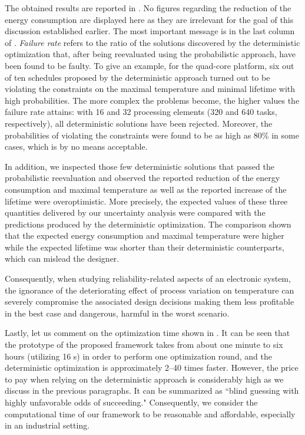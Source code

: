 The obtained results are reported in .
No figures regarding the reduction of the energy consumption are displayed here as they are irrelevant for the goal of this discussion established earlier.
The most important message is in the last column of .
\emph{Failure rate} refers to the ratio of the solutions discovered by the deterministic optimization that, after being reevaluated using the probabilistic approach, have been found to be faulty.
To give an example, for the quad-core platform, six out of ten schedules proposed by the deterministic approach turned out to be violating the constraints on the maximal temperature and minimal lifetime with high probabilities.
The more complex the problems become, the higher values the failure rate attains: with 16 and 32 processing elements (320 and 640 tasks, respectively), all deterministic solutions have been rejected.
Moreover, the probabilities of violating the constraints were found to be as high as 80\% in some cases, which is by no means acceptable.

In addition, we inspected those few deterministic solutions that passed the probabilistic reevaluation and observed the reported reduction of the energy consumption and maximal temperature as well as the reported increase of the lifetime were overoptimistic.
More precisely, the expected values of these three quantities delivered by our uncertainty analysis were compared with the predictions produced by the deterministic optimization.
The comparison shown that the expected energy consumption and maximal temperature were higher while the expected lifetime was shorter than their deterministic counterparts, which can mislead the designer.

Consequently, when studying reliability-related aspects of an electronic system, the ignorance of the deteriorating effect of process variation on temperature can severely compromise the associated design decisions making them less profitable in the best case and dangerous, harmful in the worst scenario.

Lastly, let us comment on the optimization time shown in .
It can be seen that the prototype of the proposed framework takes from about one minute to six hours (utilizing 16 s) in order to perform one optimization round, and the deterministic optimization is approximately 2--40 times faster.
However, the price to pay when relying on the deterministic approach is considerably high as we discuss in the previous paragraphs.
It can be summarized as ``blind guessing with highly unfavorable odds of succeeding."
Consequently, we consider the computational time of our framework to be reasonable and affordable, especially in an industrial setting.
